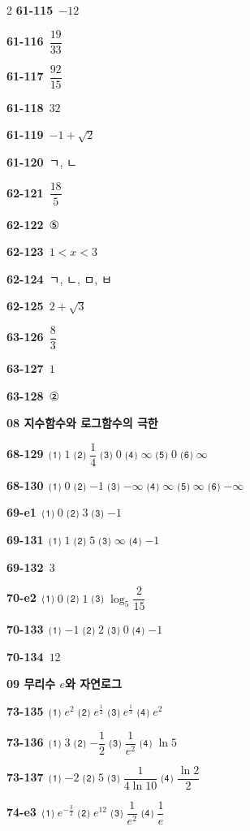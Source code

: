 \documentclass[10pt,a4paper]{article}
\begin{document}
\begin{multicols}{2}
\noindent\textbf{61-115}\ $-12$\par
\noindent\textbf{61-116}\ $\dfrac{19}{33}$\par
\noindent\textbf{61-117}\ $\dfrac{92}{15}$\par
\noindent\textbf{61-118}\ $32$\par
\noindent\textbf{61-119}\ $-1+\sqrt{2}$\par
\noindent\textbf{61-120}\ ㄱ, ㄴ\par
\noindent\textbf{62-121}\ $\dfrac{18}{5}$\par
\noindent\textbf{62-122}\ ⑤\par
\noindent\textbf{62-123}\ $1<x<3$\par
\noindent\textbf{62-124}\ ㄱ, ㄴ, ㅁ, ㅂ\par
\noindent\textbf{62-125}\ $2+\sqrt{3}$\par
\noindent\textbf{63-126}\ $\dfrac{8}{3}$\par
\noindent\textbf{63-127}\ $1$\par
\noindent\textbf{63-128}\ ②\par
\noindent\textbf{08 지수함수와 로그함수의 극한}\par\smallskip
\noindent\textbf{68-129}\ ⑴ $1$ ⑵ $\dfrac{1}{4}$ ⑶ $0$ ⑷ $\infty$ ⑸ $0$ ⑹ $\infty$\par
\noindent\textbf{68-130}\ ⑴ $0$ ⑵ $-1$ ⑶ $-\infty$ ⑷ $\infty$ ⑸ $\infty$ ⑹ $-\infty$\par
\noindent\textbf{69-e1}\ ⑴ $0$ ⑵ $3$ ⑶ $-1$\par
\noindent\textbf{69-131}\ ⑴ $1$ ⑵ $5$ ⑶ $\infty$ ⑷ $-1$\par
\noindent\textbf{69-132}\ $3$\par
\noindent\textbf{70-e2}\ ⑴ $0$ ⑵ $1$ ⑶ $\log_5\dfrac{2}{15}$\par
\noindent\textbf{70-133}\ ⑴ $-1$ ⑵ $2$ ⑶ $0$ ⑷ $-1$\par
\noindent\textbf{70-134}\ $12$\par
\noindent\textbf{09 무리수 $e$와 자연로그}\par\smallskip
\noindent\textbf{73-135}\ ⑴ $e^2$ ⑵ $e^{\frac{1}{2}}$ ⑶ $e^{\frac{1}{3}}$ ⑷ $e^2$\par
\noindent\textbf{73-136}\ ⑴ $3$ ⑵ $-\dfrac{1}{2}$ ⑶ $\dfrac{1}{e^2}$ ⑷ $\ln 5$\par
\noindent\textbf{73-137}\ ⑴ $-2$ ⑵ $5$ ⑶ $\dfrac{1}{4\ln 10}$ ⑷ $\dfrac{\ln 2}{2}$\par
\noindent\textbf{74-e3}\ ⑴ $e^{-\frac{3}{2}}$ ⑵ $e^{12}$ ⑶ $\dfrac{1}{e^2}$ ⑷ $\dfrac{1}{e}$\par

\end{multicols}
\end{document}
